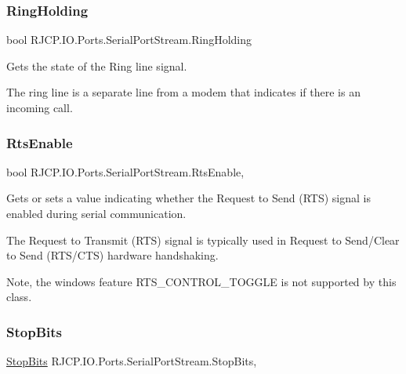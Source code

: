 \subsubsection{\texorpdfstring{RingHolding}{RingHolding}}
{\footnotesize\ttfamily bool R\+J\+C\+P.\+I\+O.\+Ports.\+Serial\+Port\+Stream.\+Ring\+Holding\hspace{0.3cm}{\ttfamily [get]}}



Gets the state of the Ring line signal. 

The ring line is a separate line from a modem that indicates if there is an incoming call. \mbox{\label{class_r_j_c_p_1_1_i_o_1_1_ports_1_1_serial_port_stream_a225eea5f304fc3a2032cdc7dce436852}} 
\subsubsection{\texorpdfstring{RtsEnable}{RtsEnable}}
{\footnotesize\ttfamily bool R\+J\+C\+P.\+I\+O.\+Ports.\+Serial\+Port\+Stream.\+Rts\+Enable\hspace{0.3cm}{\ttfamily [get]}, {\ttfamily [set]}}



Gets or sets a value indicating whether the Request to Send (R\+TS) signal is enabled during serial communication. 

The Request to Transmit (R\+TS) signal is typically used in Request to Send/\+Clear to Send (R\+T\+S/\+C\+TS) hardware handshaking. 

Note, the windows feature R\+T\+S\+\_\+\+C\+O\+N\+T\+R\+O\+L\+\_\+\+T\+O\+G\+G\+LE is not supported by this class.\mbox{\label{class_r_j_c_p_1_1_i_o_1_1_ports_1_1_serial_port_stream_a55eadfd081d106442fedabe818a6ca7f}} 
\subsubsection{\texorpdfstring{StopBits}{StopBits}}
{\footnotesize\ttfamily \mbox{\hyperlink{namespace_r_j_c_p_1_1_i_o_1_1_ports_a56a13b591d46736acafe20f2976c84fa}{Stop\+Bits}} R\+J\+C\+P.\+I\+O.\+Ports.\+Serial\+Port\+Stream.\+Stop\+Bits\hspace{0.3cm}{\ttfamily [get]}, {\ttfamily [set]}}



